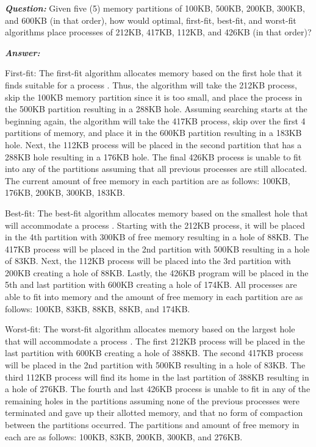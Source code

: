 \documentclass[letterpaper, 10pt,DIV=13]{scrartcl}
\numberwithin{equation}{section} %
\numberwithin{figure}{section} %
\numberwithin{table}{section} %
\begin{document}
\textbf{\emph{Question:}}
Given five (5) memory partitions of 100KB, 500KB, 200KB, 300KB, and 600KB (in that order), how would optimal, first-fit, best-fit, and worst-fit algorithms place processes of 212KB, 417KB, 112KB, and 426KB (in that order)?

\textbf{\emph{Answer:}}

First-fit:
    The first-fit algorithm allocates memory based on the first hole that it finds suitable for a process \cite{concepts}. Thus, the algorithm will take the 212KB process, skip the 100KB memory partition since it is too small, and place the process in the 500KB partition resulting in a 288KB hole. Assuming searching starts at the beginning again, the algorithm will take the 417KB process, skip over the first 4 partitions of memory, and place it in the 600KB partition resulting in a 183KB hole. Next, the 112KB process will be placed in the second partition that has a 288KB hole resulting in a 176KB hole. The final 426KB process is unable to fit into any of the partitions assuming that all previous processes are still allocated. The current amount of free memory in each partition are as follows: 100KB, 176KB, 200KB, 300KB, 183KB.

Best-fit:
    The best-fit algorithm allocates memory based on the smallest hole that will accommodate a process \cite{concepts}. Starting with the 212KB process, it will be placed in the 4th partition with 300KB of free memory resulting in a hole of 88KB. The 417KB process will be placed in the 2nd partition with 500KB resulting in a hole of 83KB. Next, the 112KB process will be placed into the 3rd partition with 200KB creating a hole of 88KB. Lastly, the 426KB program will be placed in the 5th and last partition with 600KB creating a hole of 174KB. All processes are able to fit into memory and the amount of free memory in each partition are as follows: 100KB, 83KB, 88KB, 88KB, and 174KB.

Worst-fit: 
    The worst-fit algorithm allocates memory based on the largest hole that will accommodate a process \cite{concepts}. The first 212KB process will be placed in the last partition with 600KB creating a hole of 388KB. The second 417KB process will be placed in the 2nd partition with 500KB resulting in a hole of 83KB. The third 112KB process will find its home in the last partition of 388KB resulting in a hole of 276KB. The fourth and last 426KB process is unable to fit in any of the remaining holes in the partitions assuming none of the previous processes were terminated and gave up their allotted memory, and that no form of compaction between the partitions occurred. The partitions and amount of free memory in each are as follows: 100KB, 83KB, 200KB, 300KB, and 276KB.
    
\end{document}
